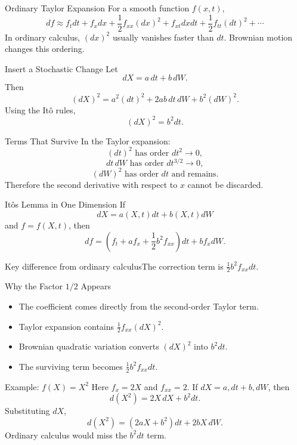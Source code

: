 \documentclass[aspectratio=169]{beamer}
\begin{document}
\begin{frame}[t]{Ordinary Taylor Expansion}
\justifying
For a smooth function $f(x,t)$,
\[df\approx f_tdt+f_xdx+\frac{1}{2}f_{xx}(dx)^2+f_{xt}dxdt+\frac{1}{2}f_{tt}(dt)^2+\cdots\]
In ordinary calculus, $(dx)^2$ usually vanishes faster than $dt$. Brownian motion changes this ordering.
\end{frame}

\begin{frame}[t]{Insert a Stochastic Change}
\justifying
Let
\[dX=a\,dt+b\,dW.\]
Then
\[(dX)^2=a^2(dt)^2+2ab\,dt\,dW+b^2(dW)^2.\]
Using the It\^o rules,
\[(dX)^2=b^2dt.\]
\end{frame}

\begin{frame}[t]{Terms That Survive}
\justifying
In the Taylor expansion:
\[(dt)^2\text{ has order }dt^2\to0,\]
\[dt\,dW\text{ has order }dt^{3/2}\to0,\]
\[(dW)^2\text{ has order }dt\text{ and remains.}\]
Therefore the second derivative with respect to $x$ cannot be discarded.
\end{frame}

\begin{frame}[t]{It\^o\textquotesingle s Lemma in One Dimension}
\justifying
If
\[dX=a(X,t)dt+b(X,t)dW\]
and $f=f(X,t)$, then
\[df=\left(f_t+af_x+\frac{1}{2}b^2f_{xx}\right)dt+bf_xdW.\]\begin{block}{Key difference from ordinary calculus}The correction term is $\tfrac12 b^2 f_{xx}dt$.\end{block}
\end{frame}

\begin{frame}[t]{Why the Factor $1/2$ Appears}
\justifying
\begin{itemize}
\item The coefficient comes directly from the second-order Taylor term.
\item Taylor expansion contains $\tfrac12 f_{xx}(dX)^2$.
\item Brownian quadratic variation converts $(dX)^2$ into $b^2dt$.
\item The surviving term becomes $\tfrac12 b^2f_{xx}dt$.
\end{itemize}
\end{frame}

\begin{frame}[t]{Example: $f(X)=X^2$}
\justifying
Here $f_x=2X$ and $f_{xx}=2$. If $dX=a,dt+b,dW$, then
\[d(X^2)=2X\,dX+b^2dt.\]
Substituting $dX$,
\[d(X^2)=(2aX+b^2)dt+2bX\,dW.\]
Ordinary calculus would miss the $b^2dt$ term.
\end{frame}
\end{document}
